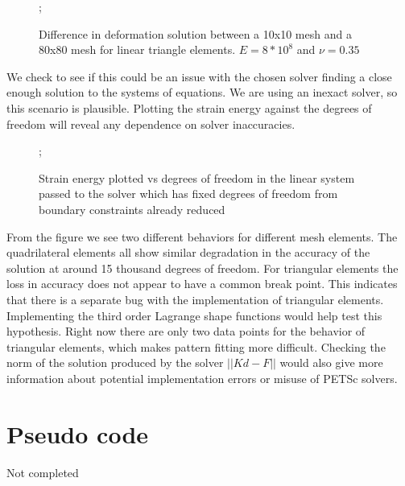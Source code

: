 \documentclass{article}
\begin{document}
\begin{figure}
    ;
    \caption{Difference in deformation solution between a 10x10 mesh and a 80x80 mesh for linear triangle elements. $E = 8*10^8$ and $\nu = 0.35$}
\centering
\end{figure}
\FloatBarrier
We check to see if this could be an issue with the chosen solver finding a close enough solution to the systems of equations. We are using an inexact solver, so this scenario is plausible. Plotting the strain energy against the degrees of freedom will reveal any dependence on solver inaccuracies.
\FloatBarrier
\begin{figure}
    ;
    \caption{Strain energy plotted vs degrees of freedom in the linear system passed to the solver which has fixed degrees of freedom from boundary constraints already reduced}
\centering
\end{figure}
\FloatBarrier
From the figure we see two different behaviors for different mesh elements. The quadrilateral elements all show similar degradation in the accuracy of the solution at around 15 thousand degrees of freedom. For triangular elements the loss in accuracy does not appear to have a common break point. This indicates that there is a separate bug with the implementation of triangular elements. Implementing the third order Lagrange shape functions would help test this hypothesis. Right now there are only two data points for the behavior of triangular elements, which makes pattern fitting more difficult. Checking the norm of the solution produced by the solver $||Kd - F||$ would also give more information about potential implementation errors or misuse of PETSc solvers.


\FloatBarrier
\section{Pseudo code}

Not completed



\end{document}

